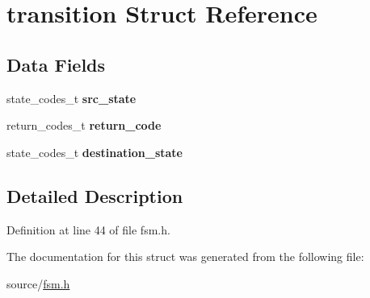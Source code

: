 \hypertarget{structtransition}{}\section{transition Struct Reference}
\label{structtransition}
\subsection*{Data Fields}
\begin{DoxyCompactItemize}
\item 
state\+\_\+codes\+\_\+t {\bfseries src\+\_\+state}\hypertarget{structtransition_aface180c1b7e268ee434c9345069ef9a}{}\label{structtransition_aface180c1b7e268ee434c9345069ef9a}

\item 
return\+\_\+codes\+\_\+t {\bfseries return\+\_\+code}\hypertarget{structtransition_ae9946d3b2fde2a6af4a08763cbdef682}{}\label{structtransition_ae9946d3b2fde2a6af4a08763cbdef682}

\item 
state\+\_\+codes\+\_\+t {\bfseries destination\+\_\+state}\hypertarget{structtransition_a8e0c6c5a7221b92e8722acdb01627a5f}{}\label{structtransition_a8e0c6c5a7221b92e8722acdb01627a5f}

\end{DoxyCompactItemize}


\subsection{Detailed Description}


Definition at line 44 of file fsm.\+h.



The documentation for this struct was generated from the following file\+:\begin{DoxyCompactItemize}
\item 
source/\hyperlink{fsm_8h}{fsm.\+h}\end{DoxyCompactItemize}

